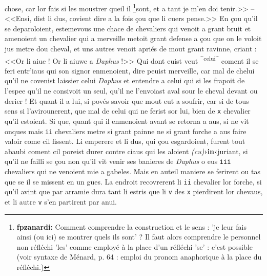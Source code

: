 \documentclass[12pt]{article} %
\newcommand{\persName}[1]{\emph{#1}} %
\newcommand{\num}[1]{\texttt{#1}}    %
\newcommand{\corr}[2]{\emph{(#1)}\textbf{›#2‹}} %
\newcommand{\add}[1]{\textsuperscript{#1}}       %
\newcommand{\fnfpz}[1]{\footnote{\textbf{fpzanardi:} #1}} %
\begin{document}
chose, car lor fais si les moustrer queil il \fnfpz{Comment comprendre la construction et le sens : 'je leur fais ainsi (ou ici) se montrer quels ils sont' ? Il faut alors comprendre le personnel non réfléchi 'les' comme employé à la place d'un réfléchi 'se' : c'est possible (voir syntaxe de Ménard, p. 64 : emploi du pronom anaphorique à la place du réfléchi.)}sont, et a tant je m'en doi tenir.>> -- <<Ensi, dist li dus, covient dire a la fois çou que li cuers pense.>> En çou qu'il se deparoloient, estemevous une chace de chevaliers qui venoit a grant bruit et amenoient un chevalier qui a merveille metoit grant defense a çou que on le voloit jus metre dou cheval, et uns autres venoit apriés de mout grant ravinne, criant : <<Or li aiue ! Or li aiuwe a \persName{Daphus} !>> Qui dont euist veut \add{^celui^} coment il se feri entr'iaus qui son signor enmenoient, dire peuist merveille, car mal de chelui qu'il ne covenist laissier celui \persName{Daphus} et entendre a celui qui si les frapoit de l'espee qu'il ne consivoit un seul, qu'il ne l'envoiast aval sour le cheval devant ou derier ! Et quant il a lui, si povés savoir que mout eut a soufrir, car si de tous sens si l'avirounerent, que mal de celui qui ne ferist sor lui, bien de \num{x} chevalier qu'il estoient. Si que, quant qui il enmenoient avant se retorna a aus, si ne vit onques mais \num{ii} chevaliers metre si grant painne ne si grant forche a aus faire valoir come cil fissent. Li emperere et li dus, qui çou esgardoient, furent tout abaubi coment cil poreist durer contre ciaus qui les aloient \corr{cu}{in}juriant, si qu'il ne failli se çou non qu'il vit venir ses banieres de \persName{Daphus} o eus \num{iii} chevaliers qui ne venoient mie a gabeles. Mais en auteil maniere se ferirent ou tas que se il se missent en un gues. La endroit recovrerent li \num{ii} chevalier lor forche, si qu'il avint que par arramie dura tant li estris que li \num{v} des \num{x} pierdirent lor chevaus, et li autre \num{v} s'en partirent par anui.
\end{document}
